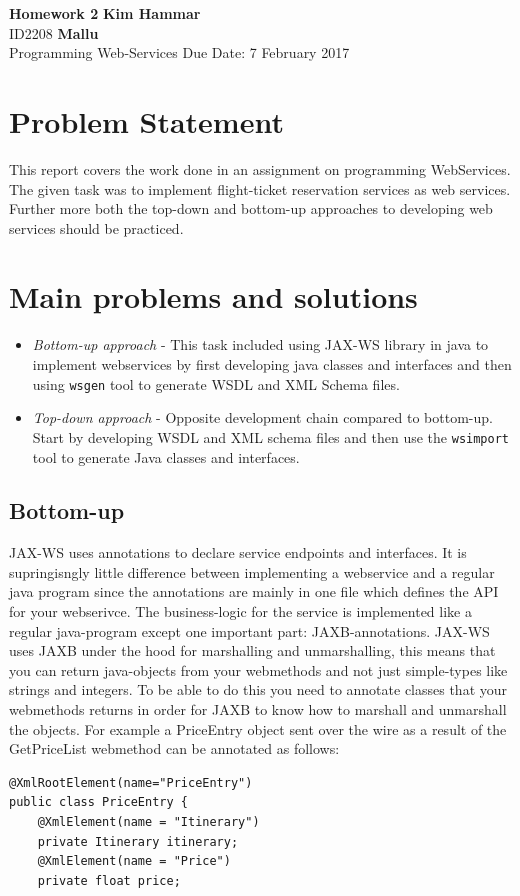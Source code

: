 \documentclass[a4paper, 11pt]{article}
\begin{document}
\noindent
\large\textbf{Homework 2} \hfill \textbf{Kim Hammar} \\
\normalsize ID2208 \hfill  \textbf{Mallu} \\
Programming Web-Services \hfill Due Date: 7 February 2017\\

\section*{Problem Statement}
This report covers the work done in an assignment on programming WebServices. The given task was to implement flight-ticket reservation services as web services. Further more both the top-down and bottom-up approaches to developing web services should be practiced.
\section*{Main problems and solutions}
\begin{itemize}
\item \textit{Bottom-up approach} - This task included using JAX-WS library \citep{jax_ws} in java to implement webservices by first developing java classes and interfaces and then using \texttt{wsgen} tool to generate WSDL and XML Schema files.
\item \textit{Top-down approach} - Opposite development chain compared to bottom-up. Start by developing WSDL and XML schema files and then use the \texttt{wsimport} tool to generate Java classes and interfaces.  
\end{itemize}

\subsection*{Bottom-up}
JAX-WS uses annotations to declare service endpoints and interfaces. It is supringisngly little difference between implementing a webservice and a regular java program since the annotations are mainly in one file which defines the API for your webserivce. The business-logic for the service is implemented like a regular java-program except one important part: JAXB-annotations. JAX-WS uses JAXB under the hood for marshalling and unmarshalling, this means that you can return java-objects from your webmethods and not just simple-types like strings and integers. To be able to do this you need to annotate classes that your webmethods returns in order for JAXB to  know how to marshall and unmarshall the objects. For example a PriceEntry object sent over the wire as a result of the GetPriceList webmethod can be annotated as follows:
\begin{lstlisting}[frame=single,style=java]
@XmlRootElement(name="PriceEntry")
public class PriceEntry {
    @XmlElement(name = "Itinerary")
    private Itinerary itinerary;
    @XmlElement(name = "Price")
    private float price;
  \end{lstlisting}
\end{document}
